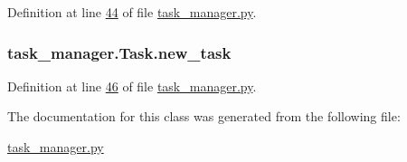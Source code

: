 Definition at line \hyperlink{task__manager_8py_source_l00044}{44} of file \hyperlink{task__manager_8py_source}{task\+\_\+manager.\+py}.

\hypertarget{classtask__manager_1_1Task_af16658f4c3c447e24f73ed3d1803e058}{
\subsubsection[{new\+\_\+task}]{\setlength{\rightskip}{0pt plus 5cm}task\+\_\+manager.\+Task.\+new\+\_\+task}}\label{classtask__manager_1_1Task_af16658f4c3c447e24f73ed3d1803e058}


Definition at line \hyperlink{task__manager_8py_source_l00046}{46} of file \hyperlink{task__manager_8py_source}{task\+\_\+manager.\+py}.



The documentation for this class was generated from the following file\+:\begin{DoxyCompactItemize}
\item 
\hyperlink{task__manager_8py}{task\+\_\+manager.\+py}\end{DoxyCompactItemize}

